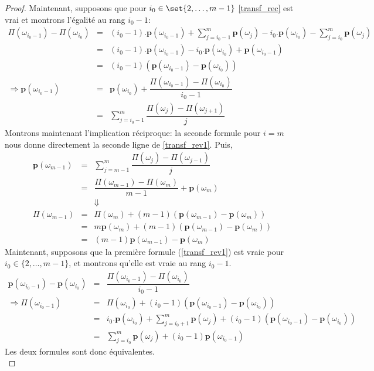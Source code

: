 {\begin{proof}
Maintenant, supposons que pour $i_0 \in \set{2,\ldots,m-1}$ \ref{transf_rec} est vrai et montrons l'égalité au rang $i_0-1$:
\begin{eqnarray}
\nonumber \Pi(\omega_{i_0-1}) - \Pi(\omega_{i_0}) & = & (i_0-1). \mathbf{p}(\omega_{i_0-1}) + \sum_{j=i_{0}-1}^{m} \mathbf{p}(\omega_{j}) - i_0.\mathbf{p}(\omega_{i_0}) - \sum_{j=i_0}^m \mathbf{p}(\omega_j) \\
\nonumber & = & (i_0-1). \mathbf{p}(\omega_{i_0-1}) - i_0.\mathbf{p}(\omega_{i_0}) + \mathbf{p}(\omega_{i_0-1}) \\
\nonumber & = & (i_0-1)(\mathbf{p}(\omega_{i_0-1})-\mathbf{p}(\omega_{i_0})) \\
\label{cons_pref_poss_prob}  \Rightarrow  \mathbf{p}(\omega_{i_0-1}) & = & \mathbf{p}(\omega_{i_0}) + \dfrac{\Pi(\omega_{i_0-1}) - \Pi(\omega_{i_0})}{i_0 -1} \\
\nonumber & = & \displaystyle \sum_{j=i_0-1}^m \dfrac{\Pi(\omega_j)-\Pi(\omega_{j+1})}{j} 
\end{eqnarray}
Montrons maintenant l'implication réciproque: la seconde formule pour $i=m$ nous donne directement la seconde ligne de \ref{transf_rev1}. Puis,
\begin{eqnarray*}
\mathbf{p}(\omega_{m-1}) & = & \sum_{j=m-1}^m \dfrac{\Pi(\omega_j) - \Pi(\omega_{j-1})}{j} \\
& = & \dfrac{\Pi(\omega_{m-1}) - \Pi(\omega_{m})}{m-1} + \mathbf{p}(\omega_m) \\
& & \Downarrow  \\
\Pi(\omega_{m-1}) & = & \Pi(\omega_m) + (m-1) (\mathbf{p}(\omega_{m-1}) -\mathbf{p}(\omega_m)) \\
& = & m\mathbf{p}(\omega_m) + (m-1) (\mathbf{p}(\omega_{m-1}) -\mathbf{p}(\omega_m)) \\
& = & (m-1) \mathbf{p}(\omega_{m-1}) - \mathbf{p}(\omega_m)
\end{eqnarray*}
Maintenant, supposons que la première formule (\ref{transf_rev1}) est vraie pour $i_0 \in \{ 2 , \ldots, m-1  \}$, et montrons qu'elle est vraie au rang $i_0-1$.
\begin{eqnarray*}
\mathbf{p}(\omega_{i_0-1}) - \mathbf{p}(\omega_{i_0}) & = & \dfrac{\Pi(\omega_{i_0-1}) - \Pi(\omega_{i_0})}{i_0-1} \\
\Rightarrow \Pi(\omega_{i_0-1}) & = & \Pi(\omega_{i_0}) +  (i_0-1)(\mathbf{p}(\omega_{i_0-1}) - \mathbf{p}(\omega_{i_0})) \\
& = &  i_0.\mathbf{p}(\omega_{i_0}) + \sum_{j=i_0+1}^m \mathbf{p}(\omega_j) +  (i_0-1)(\mathbf{p}(\omega_{i_0-1}) - \mathbf{p}(\omega_{i_0})) \\
& = & \sum_{j=i_0}^m \mathbf{p}(\omega_j) +  (i_0-1)\mathbf{p}(\omega_{i_0-1})
\end{eqnarray*}
Les deux formules sont donc équivalentes.\\


\end{proof}}
